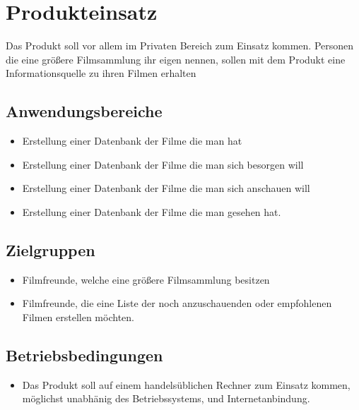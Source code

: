 \section{Produkteinsatz}
Das Produkt soll vor allem im Privaten Bereich zum Einsatz kommen. Personen die eine größere Filmsammlung ihr eigen nennen, sollen mit dem Produkt eine Informationsquelle zu ihren Filmen erhalten

\subsection{Anwendungsbereiche}
\begin{itemize}
	\item Erstellung einer Datenbank der Filme die man hat
	\item Erstellung einer Datenbank der Filme die man sich besorgen will
	\item Erstellung einer Datenbank der Filme die man sich anschauen will
	\item Erstellung einer Datenbank der Filme die man gesehen hat.
\end{itemize}

\subsection{Zielgruppen}
\begin{itemize}
	\item Filmfreunde, welche eine größere Filmsammlung besitzen
	\item Filmfreunde, die eine Liste der noch anzuschauenden oder empfohlenen Filmen erstellen möchten.
\end{itemize}

\subsection{Betriebsbedingungen}
\begin{itemize}
	\item Das Produkt soll auf einem handelsüblichen Rechner zum Einsatz kommen, möglichst unabhänig des Betriebssystems, und Internetanbindung.
\end{itemize}